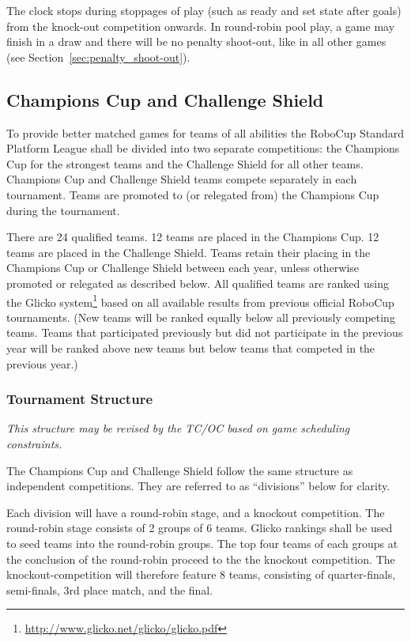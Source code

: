The clock stops during stoppages of play (such as ready and set state after goals) from the knock-out competition onwards.  In round-robin pool play, a game may finish in a draw and there will be no penalty shoot-out, like in all other games (see Section~\ref{sec:penalty_shoot-out}).

\subsection{Champions Cup and Challenge Shield}
\label{sec:twoCompetitions}

To provide better matched games for teams of all abilities the RoboCup Standard Platform League shall be divided into two separate competitions: the Champions Cup for the strongest teams and the Challenge Shield for all other teams. Champions Cup and Challenge Shield teams compete separately in each tournament. Teams are promoted to (or relegated from) the Champions Cup during the tournament. 

There are 24 qualified teams. 12 teams are placed in the Champions Cup. 12 teams are placed in the Challenge Shield. Teams retain their placing in the Champions Cup or Challenge Shield between each year, unless otherwise promoted or relegated as described below.
All qualified teams are ranked using the Glicko system\footnote{\url{http://www.glicko.net/glicko/glicko.pdf}} based on all available results from previous official RoboCup tournaments. (New teams will be ranked equally below all previously competing teams. Teams that participated previously but did not participate in the previous year will be ranked above new teams but below teams that competed in the previous year.)

\subsubsection{Tournament Structure}
\emph{This structure may be revised by the TC/OC based on game scheduling constraints.}

The Champions Cup and Challenge Shield follow the same structure as independent competitions. They are referred to as ``divisions'' below for clarity.

Each division will have a round-robin stage, and a knockout competition. The round-robin stage consists of 2 groups of 6 teams. Glicko rankings shall be used to seed teams into the round-robin groups. The top four teams of each groups at the conclusion of the round-robin proceed to the the knockout competition. The knockout-competition will therefore feature 8 teams, consisting of quarter-finals, semi-finals, 3rd place match, and the final.

